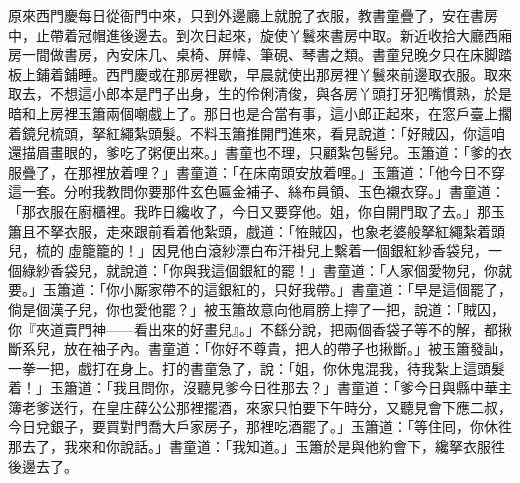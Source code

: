 原來西門慶每日從衙門中來，只到外邊廳上就脫了衣服，教書童疊了，安在書房中，止帶着冠帽進後邊去。到次日起來，旋使丫鬟來書房中取。{}新近收拾大廳西廂房一間做書房，內安床几、桌椅、屏幃、筆硯、琴書之類。書童兒晚夕只在床脚踏板上鋪着鋪睡。西門慶或在那房裡歇，早晨就使出那房裡丫鬟來前邊取衣服。取來取去，不想這小郎本是門子出身，生的伶俐清俊，與各房丫頭打牙犯嘴慣熟，於是暗和上房裡玉簫兩個嘲戲上了。那日也是合當有事，這小郎正起來，在窓戶臺上擱着鏡兒梳頭，拏紅繩紮頭髮。不料玉簫推開門進來，看見說道：「好賊囚，你這咱還描眉畫眼的，爹吃了粥便出來。」書童也不理，只顧紮包髻兒。玉簫道：「爹的衣服疊了，在那裡放着哩？」書童道：「在床南頭安放着哩。」玉簫道：「他今日不穿這一套。分咐我教問你要那件玄色匾金補子、絲布員領、玉色襯衣穿。」書童道：「那衣服在廚櫃裡。我昨日纔收了，今日又要穿他。姐，你自開門取了去。」那玉簫且不拏衣服，走來跟前看着他紮頭，戲道：「恠賊囚，也象老婆般拏紅繩紮着頭兒，梳的𩬆虛籠籠的！」{}因見他白滾紗漂白布汗褂兒上繫着一個銀紅紗香袋兒，一個綠紗香袋兒，就說道：「你與我這個銀紅的罷！」書童道：「人家個愛物兒，你就要。」玉簫道：「你小厮家帶不的這銀紅的，只好我帶。」{}書童道：「早是這個罷了，倘是個漢子兒，你也愛他罷？」{}被玉簫故意向他肩膀上擰了一把，說道：「賊囚，你『夾道賣門神——看出來的好畫兒』。」不繇分說，把兩個香袋子等不的解，都揪斷系兒，放在袖子內。{}書童道：「你好不尊貴，把人的帶子也揪斷。」被玉簫發訕，一拳一把，戲打在身上。打的書童急了，說：「姐，你休鬼混我，待我紮上這頭髮着！」玉簫道：「我且問你，沒聽見爹今日徃那去？」書童道：「爹今日與縣中華主簿老爹送行，在皇庄薛公公那裡擺酒，來家只怕要下午時分，又聽見會下應二叔，今日兌銀子，要買對門喬大戶家房子，那裡吃酒罷了。」玉簫道：「等住囘，你休徃那去了，我來和你說話。」書童道：「我知道。」玉簫於是與他約會下，纔拏衣服徃後邊去了。

